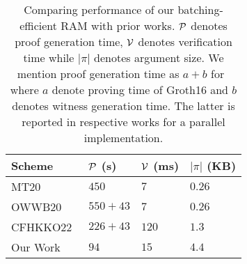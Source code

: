 \begin{table}[htbp]
    \centering
    \begin{tabularx}{0.9\textwidth}{@{}XXXX@{}}
        \toprule
        Scheme & $\mathcal{P}$ (s) & $\mathcal{V}$ (ms) & $|\pi|$ (KB) \\ \midrule
        MT20 & $450$ & $7$  & $0.26$ \\
        OWWB20~\cite{USENIX:OWWB20} & $550+43$ & $7$  & $0.26$ \\
        CFHKKO22~\cite{CCS:CFHKKO22} & $226+43$ & $120$ & $1.3$ \\
        Our Work & $94$ & $15$ & $4.4$ \\
        \bottomrule
    \end{tabularx}
    \caption{Comparing performance of our batching-efficient RAM with prior works. $\mathcal{P}$
    denotes proof generation time, $\mathcal{V}$ denotes verification time while $|\pi|$ denotes
    argument size. We mention proof generation time as $a+b$ for~\cite{USENIX:OWWB20,CCS:CFHKKO22}
    where $a$ denote proving time of \textsf{Groth16} and $b$ denotes witness generation time. The latter
    is reported in respective works for a parallel implementation.}
    \label{tbl:performance-comparison}
    \vspace*{-5mm}
\end{table}




